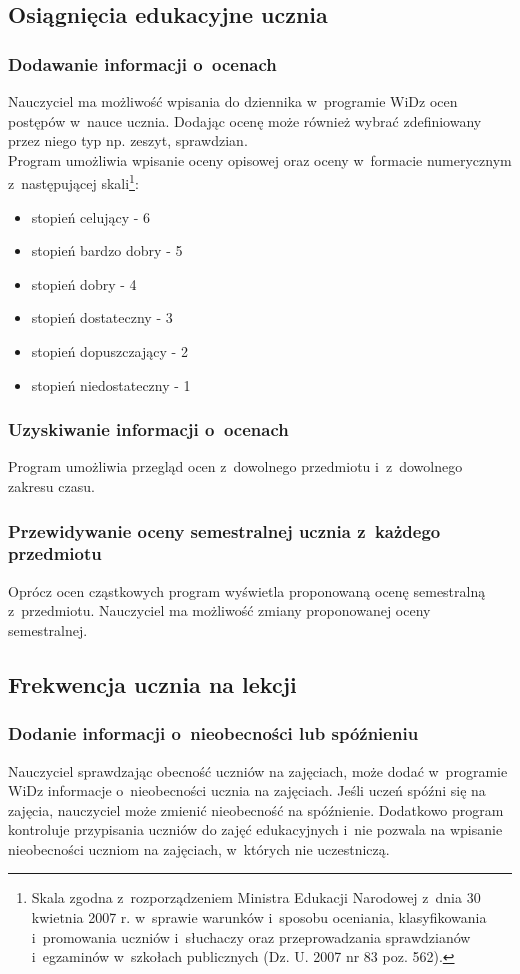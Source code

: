 \documentclass[12pt,leqno,twoside]{mwart}
\begin{document}
\subsection{Osiągnięcia edukacyjne ucznia}
\subsubsection{Dodawanie informacji o~ocenach}
\noindent Nauczyciel ma możliwość wpisania do dziennika w~programie WiDz ocen postępów w~nauce ucznia. Dodając ocenę może również wybrać zdefiniowany przez niego typ  np. zeszyt, sprawdzian. \\
\indent Program umożliwia wpisanie oceny opisowej oraz oceny w~formacie numerycznym z~następującej skali\footnote{Skala zgodna z~rozporządzeniem Ministra Edukacji Narodowej z~dnia 30 kwietnia 2007 r. w~sprawie warunków i~sposobu oceniania, klasyfikowania i~promowania uczniów i~słuchaczy oraz przeprowadzania sprawdzianów i~egzaminów w~szkołach publicznych (Dz. U. 2007 nr 83 poz. 562).}:
\begin{itemize}
	\item stopień celujący - 6
	\item stopień bardzo dobry - 5
	\item stopień dobry - 4
	\item stopień dostateczny - 3
	\item stopień dopuszczający - 2
	\item stopień niedostateczny - 1 
\end{itemize} 

\subsubsection{Uzyskiwanie informacji o~ocenach}
\noindent Program umożliwia przegląd ocen z~dowolnego przedmiotu i~z~dowolnego zakresu czasu.

\subsubsection{Przewidywanie oceny semestralnej ucznia z~każdego przedmiotu}
\noindent Oprócz ocen cząstkowych program wyświetla proponowaną ocenę semestralną z~przedmiotu. Nauczyciel ma możliwość zmiany proponowanej oceny semestralnej.

\subsection{Frekwencja ucznia na lekcji}
\subsubsection{Dodanie informacji o~nieobecności lub spóźnieniu}
\noindent Nauczyciel sprawdzając obecność uczniów na zajęciach, może dodać w~programie WiDz informacje o~nieobecności ucznia na zajęciach. Jeśli uczeń spóźni się na zajęcia, nauczyciel może zmienić nieobecność na spóźnienie. Dodatkowo program kontroluje przypisania uczniów do zajęć edukacyjnych i~nie pozwala na wpisanie nieobecności uczniom na zajęciach, w~których nie uczestniczą.
\end{document}
